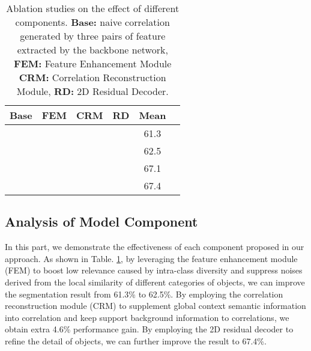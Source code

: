 \documentclass[journal]{IEEEtran}
\begin{document}
\begin{table}[t]
\renewcommand\arraystretch{1.15}
\setlength{\tabcolsep}{4.5mm}
\caption{Ablation studies on the effect of different components. \textbf{Base:} naive correlation generated by three pairs of feature extracted by the backbone network, \textbf{FEM:} Feature Enhancement Module \textbf{CRM:} Correlation Reconstruction Module, \textbf{RD:} 2D Residual Decoder.}
\label{table:ab_module}
\begin{center}
\begin{tabular}{cccccc}
\hline
\textbf{Base} & \textbf{FEM} & \textbf{CRM} & \textbf{RD} & \textbf{Mean} \\
\hline
      &    &     &    & 61.3      \\
      &    &     &    & 62.5      \\
      &      &    &      &  67.1  \\
      &      &    &      & 67.4 \\
\hline
\end{tabular}
\end{center}
\end{table}



\subsection{Analysis of Model Component}

In this part, we demonstrate the effectiveness of each component proposed in our approach. As shown in Table. \ref{table:ab_module}, by leveraging the feature enhancement module (FEM) to boost low relevance caused by intra-class diversity and suppress noises derived from the local similarity of different categories of objects, we can improve the segmentation result from 61.3\% to 62.5\%. By employing the correlation reconstruction module (CRM) to supplement global context semantic information into correlation and keep support background information to correlations, we obtain extra 4.6\% performance gain. By employing the 2D residual decoder to refine the detail of objects, we can further improve the result to 67.4\%. 
\end{document}
